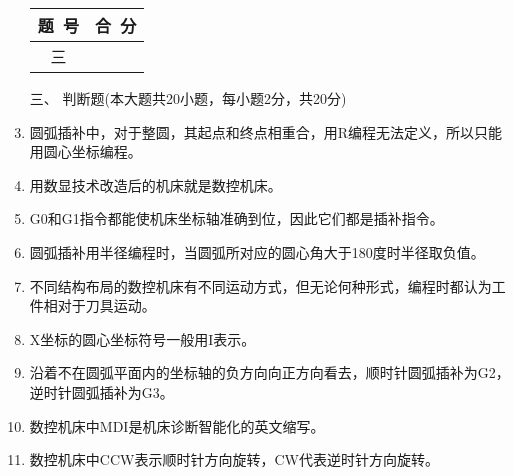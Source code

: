 \documentclass[12pt,twocolumn,landscape,UTF8,twoside]{ctexart}
\begin{document}
\begin{spacing}{1.3}
\begin{enumerate} [1、]
\vspace{1cm}			
\item[\heiti
\begin{minipage}{\@}	\begin{tabular}{|c|c|}\hline
题~号 & 合~分\\ \hline		三&       \\\hline	\end{tabular}\end{minipage} ]
\item[\heiti 三、]{\heiti 判断题(本大题共20小题，每小题2分，共20分)}
		
\item 圆弧插补中，对于整圆，其起点和终点相重合，用R编程无法定义，所以只能用圆心坐标编程。
\item 用数显技术改造后的机床就是数控机床。
\item G0和G1指令都能使机床坐标轴准确到位，因此它们都是插补指令。
\item 圆弧插补用半径编程时，当圆弧所对应的圆心角大于180度时半径取负值。
\item 不同结构布局的数控机床有不同运动方式，但无论何种形式，编程时都认为工件相对于刀具运动。
\item X坐标的圆心坐标符号一般用I表示。
\item 沿着不在圆弧平面内的坐标轴的负方向向正方向看去，顺时针圆弧插补为G2，逆时针圆弧插补为G3。
\item 数控机床中MDI是机床诊断智能化的英文缩写。
\item 数控机床中CCW表示顺时针方向旋转，CW代表逆时针方向旋转。

\end{enumerate}
\end{spacing}
\end{document}
